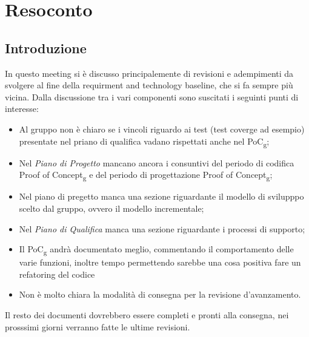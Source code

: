 \section{Resoconto}
\subsection{Introduzione}
In questo meeting si è discusso principalemente di revisioni e adempimenti da svolgere al fine della requirment and technology baseline, che si fa sempre più vicina. Dalla discussione tra i vari componenti sono suscitati i seguinti punti di interesse:

\begin{itemize}
\item Al gruppo non è chiaro se i vincoli riguardo ai test (test coverge ad esempio) presentate nel priano di qualifica vadano rispettati anche nel PoC\textsubscript{g};
\item Nel \textit{Piano di Progetto} mancano ancora i consuntivi del periodo di codifica Proof of Concept\textsubscript{g} e del periodo di progettazione Proof of Concept\textsubscript{g};
\item Nel piano di pregetto manca una sezione riguardante il modello di svilupppo scelto dal gruppo, ovvero il modello incrementale;
\item Nel \textit{Piano di Qualifica} manca una sezione riguardante i processi di supporto;
\item Il PoC\textsubscript{g} andrà documentato meglio, commentando il comportamento delle varie funzioni, inoltre tempo permettendo sarebbe una cosa positiva fare un refatoring del codice
\item Non è molto chiara la modalità di consegna per la revisione d'avanzamento.
\end{itemize}

Il resto dei documenti dovrebbero essere completi e pronti alla consegna, nei prosssimi giorni verranno fatte le ultime revisioni.
